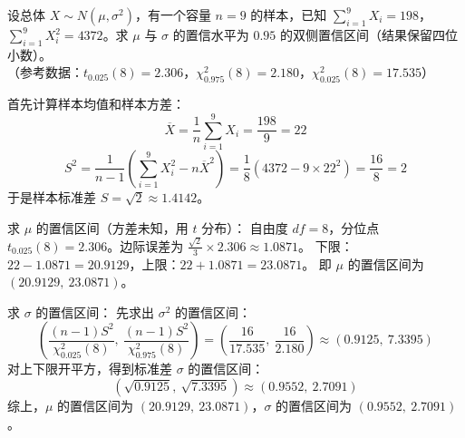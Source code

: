 \documentclass[lang=cn,11pt]{elegantbook}
\begin{document}
\begin{exercise} \label{prob:ci_6}
设总体 $X\sim N(\mu,\sigma^2)$，有一个容量 $n=9$ 的样本，已知 $\sum_{i=1}^9 X_i=198$，$\sum_{i=1}^9 X_i^2=4372$。求 $\mu$ 与 $\sigma$ 的置信水平为 $0.95$ 的双侧置信区间（结果保留四位小数）。\\
（参考数据：$t_{0.025}(8)=2.306$，$\chi^2_{0.975}(8)=2.180$，$\chi^2_{0.025}(8)=17.535$）
\end{exercise}
\begin{solution}
首先计算样本均值和样本方差：
\begin{equation*}
\overline{X} = \frac{1}{n}\sum_{i=1}^9 X_i = \frac{198}{9} = 22
\end{equation*}
\begin{equation*}
S^2 = \frac{1}{n-1}\left(\sum_{i=1}^9 X_i^2 - n\overline{X}^2\right) = \frac{1}{8}\left(4372 - 9 \times 22^2\right) = \frac{16}{8} = 2
\end{equation*}
于是样本标准差 $S = \sqrt{2} \approx 1.4142$。

求 $\mu$ 的置信区间（方差未知，用 $t$ 分布）：
自由度 $df=8$，分位点 $t_{0.025}(8)=2.306$。边际误差为 $\frac{\sqrt{2}}{3} \times 2.306 \approx 1.0871$。
下限：$22 - 1.0871 = 20.9129$，上限：$22 + 1.0871 = 23.0871$。
即 $\mu$ 的置信区间为 $(20.9129,\ 23.0871)$。

求 $\sigma$ 的置信区间：
先求出 $\sigma^2$ 的置信区间：
\begin{equation*}
\left( \frac{(n-1)S^2}{\chi^2_{0.025}(8)},\ \frac{(n-1)S^2}{\chi^2_{0.975}(8)} \right) = \left( \frac{16}{17.535},\ \frac{16}{2.180} \right) \approx (0.9125,\ 7.3395)
\end{equation*}
对上下限开平方，得到标准差 $\sigma$ 的置信区间：
\begin{equation*}
(\sqrt{0.9125},\ \sqrt{7.3395}) \approx (0.9552,\ 2.7091)
\end{equation*}
综上，$\mu$ 的置信区间为 $(20.9129,\ 23.0871)$，$\sigma$ 的置信区间为 $(0.9552,\ 2.7091)$。
\end{solution}
\end{document}

